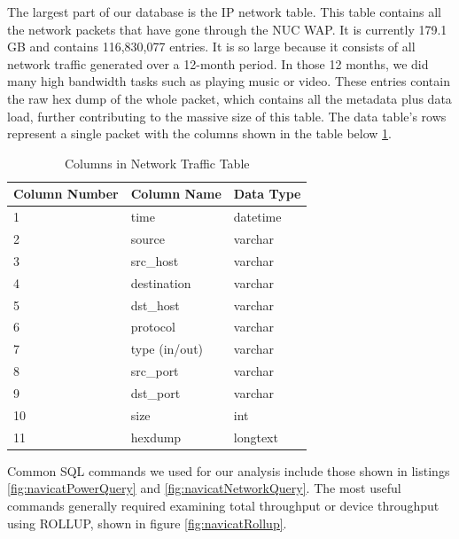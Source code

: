 The largest part of our database is the IP network table. This table contains all the network packets that have gone through the NUC WAP. It is currently 179.1 GB and contains 116,830,077 entries. It is so large because it consists of all network traffic generated over a 12-month period. In those 12 months, we did many high bandwidth tasks such as playing music or video. These entries contain the raw hex dump of the whole packet, which contains all the metadata plus data load, further contributing to the massive size of this table. The data table's rows represent a single packet with the columns shown in the table below \ref{tab:netcol}.

\begin{table}[H]
    \centering
    \caption{Columns in Network Traffic Table}
    \begin{tabular}{@{}lll@{}}
    \toprule
    Column Number & Column Name & Data Type \\ \midrule
    1             & time        & datetime  \\
    2             & source      & varchar   \\
    3             & src\_host   & varchar   \\
    4             & destination & varchar   \\
    5             & dst\_host   & varchar   \\
    6             & protocol    & varchar   \\
    7             & type (in/out)       & varchar   \\
    8             & src\_port   & varchar   \\
    9             & dst\_port   & varchar   \\
    10            & size        & int       \\
    11            & hexdump     & longtext  \\ \bottomrule
    \end{tabular}
    \label{tab:netcol}
    \end{table}

Common SQL commands we used for our analysis include those shown in listings \ref{fig:navicatPowerQuery} and \ref{fig:navicatNetworkQuery}. The most useful commands generally required examining total throughput or device throughput using ROLLUP, shown in figure \ref{fig:navicatRollup}.

